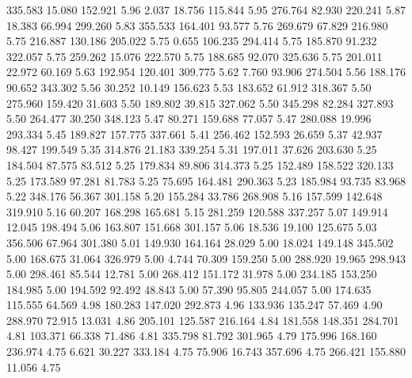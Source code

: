  335.583   15.080  152.921         5.96
   2.037   18.756  115.844         5.95
 276.764   82.930  220.241         5.87
  18.383   66.994  299.260         5.83
 355.533  164.401   93.577         5.76
 269.679   67.829  216.980         5.75
 216.887  130.186  205.022         5.75
   0.655  106.235  294.414         5.75
 185.870   91.232  322.057         5.75
 259.262   15.076  222.570         5.75
 188.685   92.070  325.636         5.75
 201.011   22.972   60.169         5.63
 192.954  120.401  309.775         5.62
   7.760   93.906  274.504         5.56
 188.176   90.652  343.302         5.56
  30.252   10.149  156.623         5.53
 183.652   61.912  318.367         5.50
 275.960  159.420   31.603         5.50
 189.802   39.815  327.062         5.50
 345.298   82.284  327.893         5.50
 264.477   30.250  348.123         5.47
  80.271  159.688   77.057         5.47
 280.088   19.996  293.334         5.45
 189.827  157.775  337.661         5.41
 256.462  152.593   26.659         5.37
  42.937   98.427  199.549         5.35
 314.876   21.183  339.254         5.31
 197.011   37.626  203.630         5.25
 184.504   87.575   83.512         5.25
 179.834   89.806  314.373         5.25
 152.489  158.522  320.133         5.25
 173.589   97.281   81.783         5.25
  75.695  164.481  290.363         5.23
 185.984   93.735   83.968         5.22
 348.176   56.367  301.158         5.20
 155.284   33.786  268.908         5.16
 157.599  142.648  319.910         5.16
  60.207  168.298  165.681         5.15
 281.259  120.588  337.257         5.07
 149.914   12.045  198.494         5.06
 163.807  151.668  301.157         5.06
  18.536   19.100  125.675         5.03
 356.506   67.964  301.380         5.01
 149.930  164.164   28.029         5.00
  18.024  149.148  345.502         5.00
 168.675   31.064  326.979         5.00
   4.744   70.309  159.250         5.00
 288.920   19.965  298.943         5.00
 298.461   85.544   12.781         5.00
 268.412  151.172   31.978         5.00
 234.185  153.250  184.985         5.00
 194.592   92.492   48.843         5.00
  57.390   95.805  244.057         5.00
 174.635  115.555   64.569         4.98
 180.283  147.020  292.873         4.96
 133.936  135.247   57.469         4.90
 288.970   72.915   13.031         4.86
 205.101  125.587  216.164         4.84
 181.558  148.351  284.701         4.81
 103.371   66.338   71.486         4.81
 335.798   81.792  301.965         4.79
 175.996  168.160  236.974         4.75
   6.621   30.227  333.184         4.75
  75.906   16.743  357.696         4.75
 266.421  155.880   11.056         4.75
